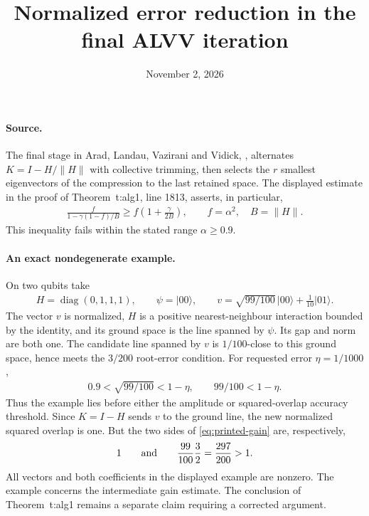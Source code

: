 \documentclass{article}
\title{Normalized error reduction in the final ALVV iteration}
\author{}
\date{November 2, 2026}
\begin{document}
\maketitle
{}

\paragraph{Source.}
The final stage in Arad, Landau, Vazirani and Vidick,
\cite[Figure~fig:algo1, lines 1634--1640]{Arad2016RigorousRG}, alternates
$K=I-H/\lVert H\rVert$ with collective trimming, then selects the $r$
smallest eigenvectors of the compression to the last retained space.
The displayed estimate in the proof of Theorem~t:alg1, line 1813,
asserts, in particular,
\begin{align}
 \frac{f}{1-\gamma(1-f)/B}
 \ge f\left(1+\frac{\gamma}{2B}\right),
 \qquad f=\alpha^2,\quad B=\lVert H\rVert.
    \label{eq:printed-gain}
\end{align}
This inequality fails within the stated range $\alpha\ge0.9$.

\paragraph{An exact nondegenerate example.}
On two qubits take
\begin{align}
 H=\operatorname{diag}(0,1,1,1),\qquad
 \psi=\lvert00\rangle,\qquad
 v=\sqrt{99/100}\,\lvert00\rangle+\tfrac1{10}\lvert01\rangle.
    \label{eq:alvv16_ffg_example_data}
\end{align}
The vector $v$ is normalized, $H$ is a positive nearest-neighbour
interaction bounded by the identity, and its ground space is the line
spanned by $\psi$. Its gap and norm are both one. The candidate line
spanned by $v$ is $1/100$-close to this ground space, hence meets the
$3/200$ root-error condition. For requested error $\eta=1/1000$,
\begin{align}
 0.9<\sqrt{99/100}<1-\eta,\qquad 99/100<1-\eta.
    \label{eq:alvv16_ffg_example_threshold}
\end{align}
Thus the example lies before either the amplitude or squared-overlap
accuracy threshold. Since $K=I-H$ sends $v$ to the ground line, the new
normalized squared overlap is one. But the two sides of
\eqref{eq:printed-gain} are, respectively,
\begin{align}
 1\qquad\hbox{and}\qquad \frac{99}{100}\frac32=\frac{297}{200}>1.
    \label{eq:alvv16_ffg_example_sides}
\end{align}
All vectors and both coefficients in the displayed example are nonzero.
The example concerns the intermediate gain estimate. The conclusion of
Theorem~t:alg1 remains a separate claim requiring a corrected argument.
\end{document}
